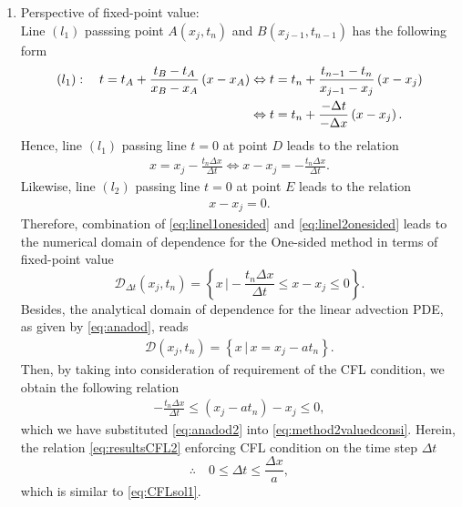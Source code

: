 \documentclass[12pt]{article}
\begin{document}
\begin{enumerate}
	\item Perspective of fixed-point value:\\
	      Line $(l_1)$ passsing point $A(x_j,t_n)$ and $B(x_{j-1},t_{n-1})$
	      has the following form
	      \begin{align}
		      (l_1):\quad 
		      t = t_A + \frac{t_B-t_A}{x_B-x_A}\left(x-x_A\right)
		       & \Leftrightarrow
		      t = t_n + \frac{t_{n-1}-t_{n}}{x_{j-1}-x_{j}} \left(x-x_{j}\right) \notag \\
		       & \Leftrightarrow
		      t = t_n + \frac{-\Delta t}{-\Delta x} \left(x-x_{j}\right).
	      \end{align}
	      Hence, line $(l_1)$ passing line $t=0$ at point $D$ leads to the relation
	      \begin{align}\label{eq:linel1onesided}
		      x = x_j - \frac{t_n \Delta x}{\Delta t}
		      \Leftrightarrow 
		      x - x_j = -\frac{t_n \Delta x}{\Delta t}.
	      \end{align}
	      Likewise, line $(l_2)$ passing line $t=0$ at point $E$ leads to the relation
	      \begin{align}\label{eq:linel2onesided}
		      x - x_{j} = 0.
	      \end{align}
	      Therefore, combination of \eqref{eq:linel1onesided}
	      and \eqref{eq:linel2onesided} leads to the numerical domain of dependence
	      for the One-sided method in terms of fixed-point value
	      \begin{equation}\label{eq:method2valuedconsi}
		      \boxed{
			      \mathcal{D}_{\Delta t}\left(x_j,t_n\right)
			      =  \left\{ x\, \Big| -\frac{t_n \Delta x}{\Delta t} \leq x - x_j \leq 0 \right\}.
		      }
	      \end{equation}
	      Besides, the analytical domain of dependence for the linear advection PDE,
	      as given by \eqref{eq:anadod}, reads
	      \begin{align}\label{eq:anadod2}
		      \mathcal{D}\left(x_j,t_n\right)
		      =  \left\{ x \, \Big|\, x = x_{j} - at_n \right\} .
	      \end{align}
	      Then, by taking into consideration of requirement of the CFL condition, we obtain the 
	      following relation
	      \begin{align}\label{eq:resultsCFL2}
		      -\frac{t_n \Delta x}{\Delta t} \leq \left(x_{j} - at_n\right) - x_j \leq 0,
	      \end{align}
	      which we have substituted \eqref{eq:anadod2} into \eqref{eq:method2valuedconsi}.
	      Herein, the relation \eqref{eq:resultsCFL2} enforcing CFL condition
	      on the time step $\Delta t$
	      \begin{equation}
		      \therefore\quad
		      \boxed{
			      0 \leq \Delta t \leq \frac{\Delta x}{a},
		      }
	      \end{equation}
	      which is similar to \eqref{eq:CFLsol1}.
\end{enumerate}
\end{document}
